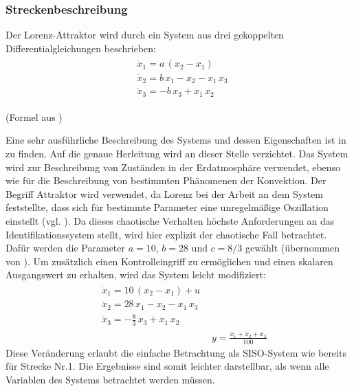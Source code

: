             \subsubsection{Streckenbeschreibung}
                Der Lorenz-Attraktor wird durch ein System aus drei gekoppelten Differentialgleichungen beschrieben:
                \begin{align}
                    \begin{split}
                    &\dot{x}_1 = a\,(x_2 - x_1)\\
                    &\dot{x}_2 = b\,x_1 −x_2 −x_1\,x_3\\
                    &\dot{x}_3 = − b\,x_3 + x_1\,x_2
                    \end{split}
                \end{align}
                \begin{flushright}
                    (Formel aus \cite{prill})
                \end{flushright}
                Eine sehr ausführliche Beschreibung des Systems und dessen Eigenschaften ist in \cite{prill} zu finden. Auf die genaue Herleitung wird an dieser Stelle verzichtet. 
                Das System wird zur Beschreibung von Zuständen in der Erdatmosphäre verwendet, ebenso wie für die Beschreibung von bestimmten Phänomenen der Konvektion. Der Begriff 
                Attraktor wird verwendet, da Lorenz bei der Arbeit an dem System feststellte, dass sich für bestimmte Parameter eine unregelmäßige Oszillation einstellt (vgl. \cite{prill}).
                Da dieses chaotische Verhalten höchste Anforderungen an das Identifikationssystem stellt, wird hier explizit der chaotische Fall betrachtet. 
                Dafür werden die Parameter $a = 10$, $b = 28$ und $c = 8/3$ gewählt (übernommen von \cite{wiki}). Um zusätzlich einen Kontrolleingriff zu ermöglichen und einen skalaren 
                Ausgangswert zu erhalten, wird das System leicht modifiziert:
                \begin{align}
                    \begin{split}
                    &\dot{x}_1 = 10\,(x_2 - x_1)+u\\
                    &\dot{x}_2 = 28\,x_1 −x_2 −x_1\,x_3\\
                    &\dot{x}_3 = − \frac{8}{3}\,x_3 + x_1\,x_2
                    \end{split}\\
                    &y = \frac{x_1+x_2+x_3}{100}
                \end{align}
                Diese Veränderung erlaubt die einfache Betrachtung als SISO-System wie bereits für Strecke Nr.1. Die Ergebnisse sind somit leichter darstellbar, als wenn 
                alle Variablen des Systems betrachtet werden müssen.
                
